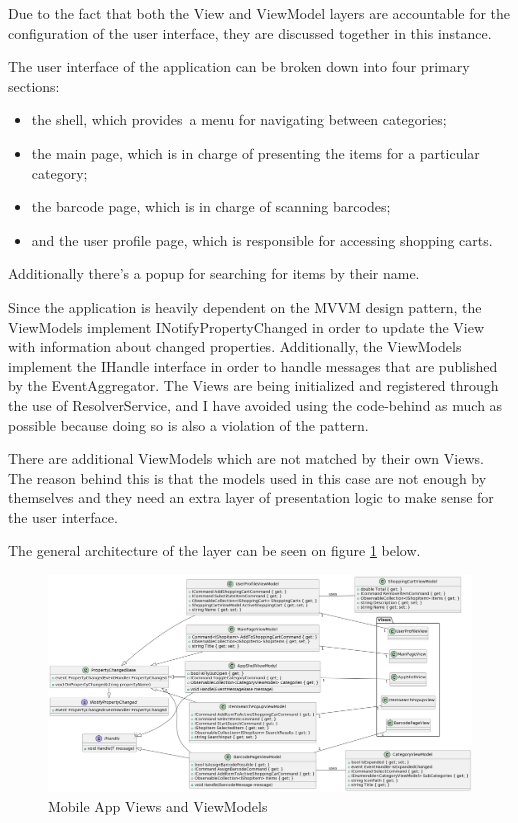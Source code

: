 Due to the fact that both the View and ViewModel layers are accountable for the configuration of the user interface, they are discussed together in this instance. 

The user interface of the application can be broken down into four primary sections: \begin{itemize}
	\item the shell, which provides a menu for navigating between categories;
	\item the main page, which is in charge of presenting the items for a particular category;
	\item the barcode page, which is in charge of scanning barcodes;
	\item  and the user profile page, which is responsible for accessing shopping carts.
\end{itemize} 
Additionally there's a popup for searching for items by their name.

Since the application is heavily dependent on the MVVM design pattern, the ViewModels implement INotifyPropertyChanged in order to update the View with information about changed properties. Additionally, the ViewModels implement the IHandle interface in order to handle messages that are published by the EventAggregator. The Views are being initialized and registered through the use of ResolverService, and I have avoided using the code-behind as much as possible because doing so is also a violation of the pattern.

There are additional ViewModels which are not matched by their own Views. The reason behind this is that the models used in this case are not enough by themselves and they need an extra layer of presentation logic to make sense for the user interface.

The general architecture of the layer can be seen on figure \ref{fig:appviewmodels} below.

\begin{figure}[H]
	\centering
	\includegraphics[width=1\linewidth]{img/app_viewmodels.png}
	\caption{Mobile App Views and ViewModels}
	\label{fig:appviewmodels}
\end{figure}


